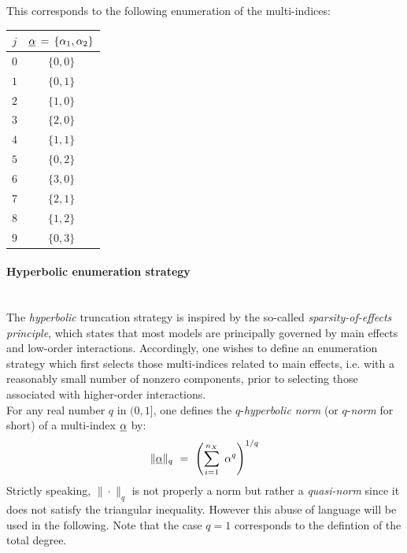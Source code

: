 {This corresponds to the following enumeration of the multi-indices:

\begin{center}		
\begin{tabular}{cc}
\hline
$j$ & $\underline{\alpha} \, = \, \{\alpha_1,\alpha_2\} $\\
\hline
$0$ & $\{0,0\}$ \\
$1$ & $\{0,1\}$ \\
$2$ & $\{1,0\}$ \\
$3$ & $\{2,0\}$ \\
$4$ &$ \{1,1\}$\\
$5$ & $\{0,2\}$ \\
$6$ & $\{3,0\}$ \\
$7$ & $\{2,1\}$ \\
$8$ & $\{1,2\}$ \\
$9$ & $\{0,3\}$ \\
\hline
\end{tabular}
\end{center} 

\paragraph*{Hyperbolic enumeration strategy \\ \\}
The \emph{hyperbolic} truncation strategy is inspired by the so-called \emph{sparsity-of-effects principle}, which states that most models are principally governed by main effects and low-order interactions. Accordingly, one wishes to define an enumeration strategy which first selects those multi-indices related to main effects, i.e. with a reasonably small number of nonzero components, prior to selecting those associated with higher-order interactions. \\

For any real number $q$ in $(0,1]$, one defines the $q$-\emph{hyperbolic norm} (or $q$-\emph{norm} for short) of a multi-index $\underline{\alpha}$ by:
\begin{equation}
  \|\underline{\alpha}\|_{q} \, \, = \, \, \left(\sum_{i=1}^{n_X} \; \alpha^q \right)^{1/q}
\end{equation}
Strictly speaking, $\|\cdot\|_q$ is not properly a norm but rather a \emph{quasi-norm} since it does not satisfy the triangular inequality. However this abuse of language will be used in the following. Note that the case $q=1$ corresponds to the defintion of the total degree.  \\

}
